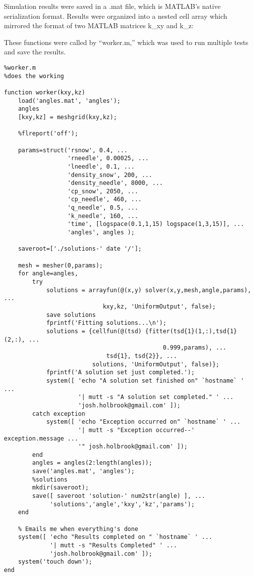 Simulation results were saved in a .mat file, which is MATLAB's native
serialization format. Results were organized into a nested cell array which
mirrored the format of two MATLAB matrices k\_xy and k\_z:

These functions were called by ``worker.m,'' which was used to run multiple
tests and save the results.

\small
\begin{verbatim}
%worker.m
%does the working

function worker(kxy,kz)
    load('angles.mat', 'angles');
    angles
    [kxy,kz] = meshgrid(kxy,kz);

    %flreport('off');

    params=struct('rsnow', 0.4, ...
                  'rneedle', 0.00025, ...
                  'lneedle', 0.1, ...
                  'density_snow', 200, ...
                  'density_needle', 8000, ...
                  'cp_snow', 2050, ...
                  'cp_needle', 460, ...
                  'q_needle', 0.5, ...
                  'k_needle', 160, ...
                  'time', [logspace(0.1,1,15) logspace(1,3,15)], ...
                  'angles', angles );

    saveroot=['./solutions-' date '/'];

    mesh = mesher(0,params);
    for angle=angles,
        try
            solutions = arrayfun(@(x,y) solver(x,y,mesh,angle,params), ...
                            kxy,kz, 'UniformOutput', false);
            save solutions
            fprintf('Fitting solutions...\n');
            solutions = {cellfun(@(tsd) {fitter(tsd{1}(1,:),tsd{1}(2,:), ...
                                             0.999,params), ...
                             tsd{1}, tsd{2}}, ...
                         solutions, 'UniformOutput', false)};
            fprintf('A solution set just completed.');
            system([ 'echo "A solution set finished on" `hostname` ' ...
                     '| mutt -s "A solution set completed." ' ...
                     'josh.holbrook@gmail.com' ]);
        catch exception
            system([ 'echo "Exception occurred on" `hostname` ' ...
                     '| mutt -s "Exception occurred--' exception.message ...
                     '" josh.holbrook@gmail.com' ]);
        end
        angles = angles(2:length(angles));
        save('angles.mat', 'angles');
        %solutions
        mkdir(saveroot);
        save([ saveroot 'solution-' num2str(angle) ], ...
             'solutions','angle','kxy','kz','params');
    end

    % Emails me when everything's done
    system([ 'echo "Results completed on " `hostname` ' ...
             '| mutt -s "Results Completed" ' ...
             'josh.holbrook@gmail.com' ]);
    system('touch down');
end
\end{verbatim}
\normalsize

